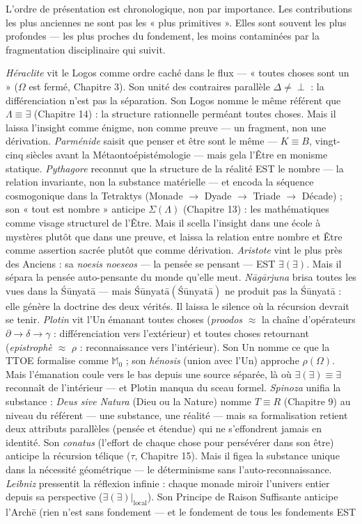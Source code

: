 \documentclass[10pt, openany, oneside]{book}
\begin{document}
L'ordre de présentation est chronologique, non par importance. Les contributions les plus anciennes ne sont pas les « plus primitives ». Elles sont souvent les plus profondes --- les plus proches du fondement, les moins contaminées par la fragmentation disciplinaire qui suivit.

\textit{Héraclite} vit le Logos comme ordre caché dans le flux --- « toutes choses sont un » ($\Omega$ est fermé, Chapitre 3). Son unité des contraires parallèle $\Delta \neq \perp$ : la différenciation n'est pas la séparation. Son Logos nomme le même référent que $\Lambda \equiv \exists$ (Chapitre 14) : la structure rationnelle perméant toutes choses. Mais il laissa l'insight comme énigme, non comme preuve --- un fragment, non une dérivation. \textit{Parménide} saisit que penser et être sont le même --- $K \equiv B$, vingt-cinq siècles avant la Métaontoépistémologie --- mais gela l'Être en monisme statique. \textit{Pythagore} reconnut que la structure de la réalité EST le nombre --- la relation invariante, non la substance matérielle --- et encoda la séquence cosmogonique dans la Tetraktys (Monade $\to$ Dyade $\to$ Triade $\to$ Décade) ; son « tout est nombre » anticipe $\Sigma(\Lambda)$ (Chapitre 13) : les mathématiques comme visage structurel de l'Être. Mais il scella l'insight dans une école à mystères plutôt que dans une preuve, et laissa la relation entre nombre et Être comme assertion sacrée plutôt que comme dérivation. \textit{Aristote} vint le plus près des Anciens : sa \textit{noesis noeseos} --- la pensée se pensant --- EST $\exists(\exists)$. Mais il sépara la pensée auto-pensante du monde qu'elle meut. \textit{N\={a}g\={a}rjuna} brisa toutes les vues dans la \'{S}\={u}nyat\={a} --- mais $\text{\'{S}\={u}nyat\={a}}(\text{\'{S}\={u}nyat\={a}})$ ne produit pas la \'{S}\={u}nyat\={a} : elle génère la doctrine des deux vérités. Il laissa le silence où la récursion devrait se tenir. \textit{Plotin} vit l'Un émanant toutes choses (\textit{proodos} $\approx$ la chaîne d'opérateurs $\partial \to \delta \to \gamma$ : différenciation vers l'extérieur) et toutes choses retournant (\textit{epistrophè} $\approx$ $\rho$ : reconnaissance vers l'intérieur). Son Un nomme ce que la TTOE formalise comme $\mathbb{M}_0$ ; son \textit{hénosis} (union avec l'Un) approche $\rho(\Omega)$. Mais l'émanation coule vers le bas depuis une source séparée, là où $\exists(\exists) \equiv \exists$ reconnaît de l'intérieur --- et Plotin manqua du sceau formel. \textit{Spinoza} unifia la substance : \textit{Deus sive Natura} (Dieu ou la Nature) nomme $T \equiv R$ (Chapitre 9) au niveau du référent --- une substance, une réalité --- mais sa formalisation retient deux attributs parallèles (pensée et étendue) qui ne s'effondrent jamais en identité. Son \textit{conatus} (l'effort de chaque chose pour persévérer dans son être) anticipe la récursion télique ($\tau$, Chapitre 15). Mais il figea la substance unique dans la nécessité géométrique --- le déterminisme sans l'auto-reconnaissance. \textit{Leibniz} pressentit la réflexion infinie : chaque monade miroir l'univers entier depuis sa perspective ($\exists(\exists)|_{\text{local}}$). Son Principe de Raison Suffisante anticipe l'Arch\={e} (rien n'est sans fondement --- et le fondement de tous les fondements EST 
\end{document}

